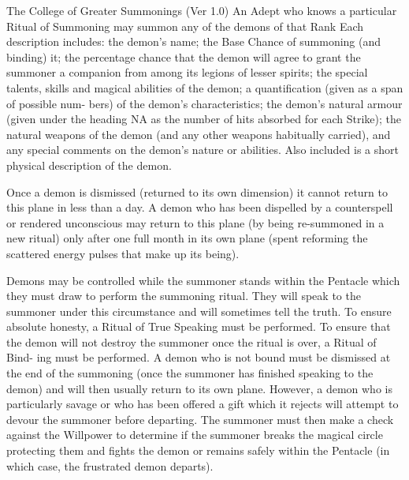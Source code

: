\begin{Chapter}{The College of Greater Summonings (Ver 1.0)}
An Adept who knows a particular Ritual of Summoning may summon any of
the demons of that Rank Each description includes: the demon’s name;
the Base Chance of summoning (and binding) it; the percentage chance
that the demon will agree to grant the summoner a companion from among
its legions of lesser spirits; the special talents, skills and magical
abilities of the demon; a quantification (given as a span of possible
num- bers) of the demon’s characteristics; the demon’s natural armour
(given under the heading NA as the number of hits absorbed for each
Strike); the natural weapons of the demon (and any other weapons
habitually carried), and any special comments on the demon’s nature or
abilities.  Also included is a short physical description of the
demon.

Once a demon is dismissed (returned to its own dimension) it cannot
return to this plane in less than a day.  A demon who has been
dispelled by a counterspell or rendered unconscious may return to this
plane (by being re-summoned in a new ritual) only after one full month
in its own plane (spent reforming the scattered energy pulses that
make up its being).

Demons may be controlled while the summoner stands within the Pentacle
which they must draw to perform the summoning ritual.  They will speak
to the summoner under this circumstance and will sometimes tell the
truth.  To ensure absolute honesty, a Ritual of True Speaking must be
performed.  To ensure that the demon will not destroy the summoner
once the ritual is over, a Ritual of Bind- ing must be performed. A
demon who is not bound must be dismissed at the end of the summoning
(once the summoner has finished speaking to the demon) and will then
usually return to its own plane.  However, a demon who is particularly
savage or who has been offered a gift which it rejects will attempt to
devour the summoner before departing.  The summoner must then make a
check against the Willpower to determine if the summoner breaks the
magical circle protecting them and fights the demon or remains safely
within the Pentacle (in which case, the frustrated demon departs).


\end{Chapter}
